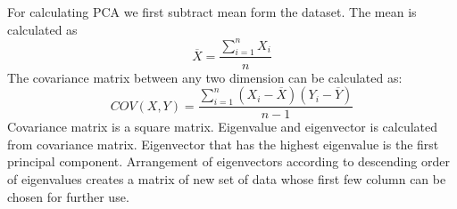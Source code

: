 \documentclass[document.tex]{subfiles}
\begin{document}
\noindent For calculating PCA we first subtract mean form the dataset. The mean is calculated as
\begin{equation}
\overline{X} = \dfrac{\sum_{i=1}^{n} X_i}{n}
\label{eq:Mean}
\end{equation}
The covariance matrix between any two dimension can be calculated as:
\begin{equation}
COV(X,Y) = \dfrac{\sum_{i=1}^{n}(X_i - \overline{X})(Y_i - \overline{Y})}{n-1}
\end{equation}
Covariance matrix is a square matrix. Eigenvalue and eigenvector is calculated from covariance matrix. Eigenvector that has the highest eigenvalue is the first principal component. Arrangement of eigenvectors according to descending order of eigenvalues creates a matrix of new set of data whose first few column can be chosen for further use.
 
\end{document}

